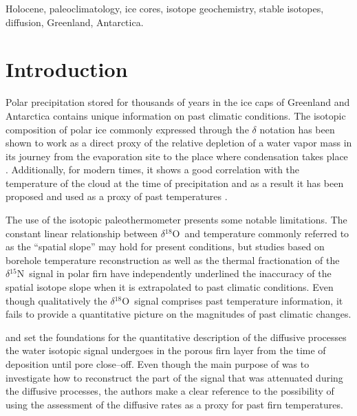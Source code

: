 \documentclass[11pt, draftcls, onecolumn]{IEEEtran} %
\numberwithin{equation}{section}
\numberwithin{table}{section}
\numberwithin{figure}{section}
\newcommand{\delOx}{$\delta{}^{18}\mathrm{O}$}
\newcommand{\delN}{$\delta{}^{15}\mathrm{N}$}
\begin{document}

\begin{IEEEkeywords} 
Holocene, paleoclimatology, ice cores, isotope geochemistry, stable isotopes, diffusion, Greenland, Antarctica.	
\end{IEEEkeywords}



\section{Introduction} %
\label{Intro}
Polar precipitation stored for thousands of years in the ice caps of Greenland and Antarctica
contains unique information on past climatic conditions. The isotopic composition 
of polar ice  commonly expressed
through the $\delta$ notation
has been shown to work as a direct proxy of the relative depletion of a water vapor mass in its 
journey from the evaporation site to the place where condensation takes place \citep{Epstein1951, IAEA}. 
Additionally, for modern times, it shows a good correlation with the temperature of the cloud at the
time of precipitation \citep{Dansgaard2, Dansgaard} and as a result it has been proposed and used 
as a proxy of past temperatures \citep{Jouzel1984, Jouzel1997, Johnsen2001}. 


The use of the isotopic paleothermometer presents some notable limitations.
The constant linear relationship between \delOx~and temperature commonly referred to as the ``spatial slope''
may hold for present conditions, 
but studies based on borehole temperature reconstruction \citep{Cuffey1994, JOHNSEN1995a} 
as well as the thermal fractionation of the \delN~signal in polar firn 
\citep{Severinghaus1998, Severinghaus1999} have
independently underlined the inaccuracy of the spatial isotope slope when it is extrapolated to past climatic 
conditions. 
Even though qualitatively the \delOx~signal comprises past temperature information, it fails
to provide a quantitative picture on the magnitudes of past climatic changes.

\cite{Johnsen1977, WhillansGrootes1985} and \cite{Johnsen2000} set the foundations for the quantitative description 
of the diffusive processes the water isotopic signal undergoes in the porous firn layer from the time
of deposition until pore close--off. Even though the main purpose of \cite{Johnsen2000} was to investigate
how to reconstruct the part of the signal that was attenuated during the diffusive processes, the authors
make a clear reference to the possibility of using the assessment of the diffusive rates as a proxy for
past firn temperatures. 
\end{document}
